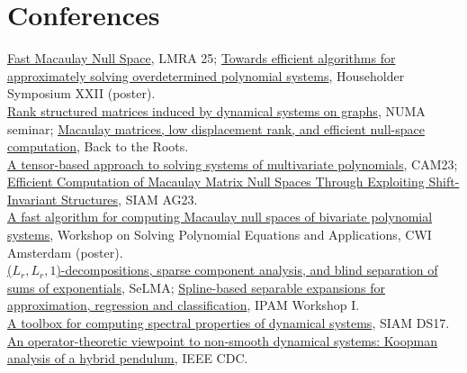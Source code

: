 \documentclass[10pt, a4paper]{article}
\newcommand{\years}[1]{\marginnote{\makebox[\marginparwidth][r]{\scriptsize\color{cvmuted}#1}} }
\begin{document}
\section*{Conferences}
\noindent
\years{2025}\href{https://sites.google.com/view/lrma25/}{Fast Macaulay Null Space}, LMRA 25; \href{https://nithingovindarajan.github.io/assets/pdf/Householderposter.pdf}{Towards efficient algorithms for approximately solving overdetermined polynomial systems}, Householder Symposium XXII (poster).\\
\years{2024} \href{https://nithingovindarajan.github.io/assets/pdf/Rank_structured_matrices_induced_by_dynamical_systems_on_graphs.pdf}{Rank structured matrices induced by dynamical systems on graphs}, NUMA seminar; \href{https://nithingovindarajan.github.io/assets/pdf/back_to_the_roots.pdf}{Macaulay matrices, low displacement rank, and efficient null-space computation}, Back to the Roots.\\
\years{2023} \href{https://nithingovindarajan.github.io/assets/pdf/presentation_CAM_23.pdf}{A tensor-based approach to solving systems of multivariate polynomials}, CAM23; \href{https://nithingovindarajan.github.io/assets/pdf/Macaulay_presentation_SIAM_AG23.pdf}{Efficient Computation of Macaulay Matrix Null Spaces Through Exploiting Shift-Invariant Structures}, SIAM AG23.\\
\years{2022} \href{https://nithingovindarajan.github.io/assets/pdf/CWIposter.pdf}{A fast algorithm for computing Macaulay null spaces of bivariate polynomial systems}, Workshop on Solving Polynomial Equations and Applications, CWI Amsterdam (poster).\\
\years{2021} \href{https://nithingovindarajan.github.io/assets/pdf/SELMA_LL1_talk.pdf}{($L_r,L_r,1$)-decompositions, sparse component analysis, and blind separation of sums of exponentials}, SeLMA; \href{https://nithingovindarajan.github.io/assets/pdf/IPAM_splines.pdf}{Spline-based separable expansions for approximation, regression and classification}, IPAM Workshop I.\\
\years{2017} \href{https://nithingovindarajan.github.io/assets/pdf/DS17periodicapprx.compressed.pdf}{A toolbox for computing spectral properties of dynamical systems}, SIAM DS17.\\
\years{2016} \href{https://ieeexplore.ieee.org/abstract/document/7799266}{An operator-theoretic viewpoint to non-smooth dynamical systems: Koopman analysis of a hybrid pendulum}, IEEE CDC.


\end{document}
